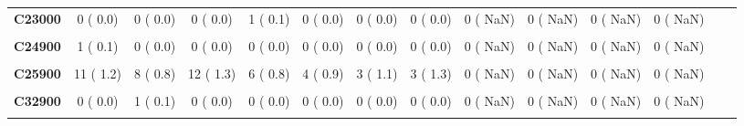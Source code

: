 \documentclass[
]{article}
\begin{document}
\begin{table}[H]
\begin{tabular}[t]{>{\raggedright\arraybackslash}p{5em}ccccccccccccc}
\textbf{C23000} & 0 (  0.0) & 0 (  0.0) & 0 (  0.0) & 1 (  0.1) & 0 (  0.0) & 0 (  0.0) & 0 (  0.0) & 0 (  NaN) & 0 (  NaN) & 0 (  NaN) & 0 (  NaN) &  & \\
\textbf{\cellcolor{gray!10}{C24000}} & \cellcolor{gray!10}{0 (  0.0)} & \cellcolor{gray!10}{1 (  0.1)} & \cellcolor{gray!10}{0 (  0.0)} & \cellcolor{gray!10}{0 (  0.0)} & \cellcolor{gray!10}{1 (  0.2)} & \cellcolor{gray!10}{0 (  0.0)} & \cellcolor{gray!10}{0 (  0.0)} & \cellcolor{gray!10}{0 (  NaN)} & \cellcolor{gray!10}{0 (  NaN)} & \cellcolor{gray!10}{0 (  NaN)} & \cellcolor{gray!10}{0 (  NaN)} & \cellcolor{gray!10}{} & \cellcolor{gray!10}{}\\
\textbf{C24900} & 1 (  0.1) & 0 (  0.0) & 0 (  0.0) & 0 (  0.0) & 0 (  0.0) & 0 (  0.0) & 0 (  0.0) & 0 (  NaN) & 0 (  NaN) & 0 (  NaN) & 0 (  NaN) &  & \\
\textbf{\cellcolor{gray!10}{C25000}} & \cellcolor{gray!10}{0 (  0.0)} & \cellcolor{gray!10}{0 (  0.0)} & \cellcolor{gray!10}{1 (  0.1)} & \cellcolor{gray!10}{4 (  0.5)} & \cellcolor{gray!10}{0 (  0.0)} & \cellcolor{gray!10}{1 (  0.4)} & \cellcolor{gray!10}{0 (  0.0)} & \cellcolor{gray!10}{0 (  NaN)} & \cellcolor{gray!10}{0 (  NaN)} & \cellcolor{gray!10}{0 (  NaN)} & \cellcolor{gray!10}{0 (  NaN)} & \cellcolor{gray!10}{} & \cellcolor{gray!10}{}\\
\textbf{C25900} & 11 (  1.2) & 8 (  0.8) & 12 (  1.3) & 6 (  0.8) & 4 (  0.9) & 3 (  1.1) & 3 (  1.3) & 0 (  NaN) & 0 (  NaN) & 0 (  NaN) & 0 (  NaN) &  & \\
\textbf{\cellcolor{gray!10}{C30000}} & \cellcolor{gray!10}{0 (  0.0)} & \cellcolor{gray!10}{0 (  0.0)} & \cellcolor{gray!10}{0 (  0.0)} & \cellcolor{gray!10}{0 (  0.0)} & \cellcolor{gray!10}{0 (  0.0)} & \cellcolor{gray!10}{0 (  0.0)} & \cellcolor{gray!10}{1 (  0.4)} & \cellcolor{gray!10}{0 (  NaN)} & \cellcolor{gray!10}{0 (  NaN)} & \cellcolor{gray!10}{0 (  NaN)} & \cellcolor{gray!10}{0 (  NaN)} & \cellcolor{gray!10}{} & \cellcolor{gray!10}{}\\
\textbf{C32900} & 0 (  0.0) & 1 (  0.1) & 0 (  0.0) & 0 (  0.0) & 0 (  0.0) & 0 (  0.0) & 0 (  0.0) & 0 (  NaN) & 0 (  NaN) & 0 (  NaN) & 0 (  NaN) &  & \\
\textbf{\cellcolor{gray!10}{C34100}} & \cellcolor{gray!10}{1 (  0.1)} & \cellcolor{gray!10}{0 (  0.0)} & \cellcolor{gray!10}{0 (  0.0)} & \cellcolor{gray!10}{0 (  0.0)} & \cellcolor{gray!10}{0 (  0.0)} & \cellcolor{gray!10}{0 (  0.0)} & \cellcolor{gray!10}{0 (  0.0)} & \cellcolor{gray!10}{0 (  NaN)} & \cellcolor{gray!10}{0 (  NaN)} & \cellcolor{gray!10}{0 (  NaN)} & \cellcolor{gray!10}{0 (  NaN)} & \cellcolor{gray!10}{} & \cellcolor{gray!10}{}\\

\end{tabular}
\end{table}
\end{document}
